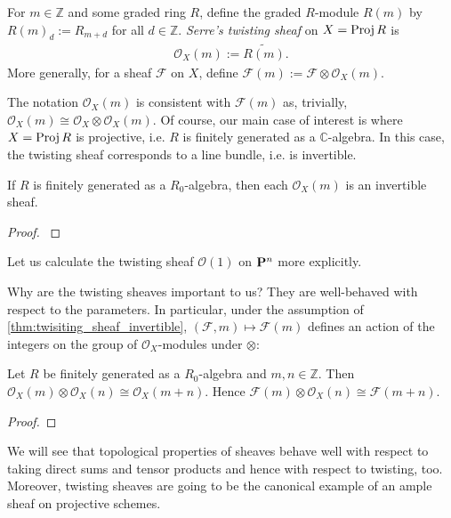 \documentclass[12pt]{ociamthesis}  %
\begin{document}
\begin{definition}
  For $m\in\mathbb{Z}$ and some graded ring $R$, define the graded
  $R$-module $R(m)$ by $R(m)_d := R_{m+d}$ for all $d\in\mathbb{Z}$. \emph{Serre's
    twisting sheaf} on $X=\operatorname{Proj} R$ is
  \begin{align*}
    \mathscr O_X(m) := \widetilde{R(m)}.
  \end{align*}
  More generally, for a sheaf $\mathscr F$ on $X$, define
  $\mathscr F(m) := \mathscr F \otimes \mathscr O_X(m)$.
\end{definition}
The notation $\mathscr O_X(m)$ is consistent with $\mathscr F(m)$
as, trivially, $\mathscr O_X(m) \cong \mathscr O_X \otimes \mathscr O_X(m)$.
Of course, our main case of interest is where $X=\operatorname{Proj} R$ is
projective, i.e. $R$ is finitely generated as a $\mathbb C$-algebra.
In this case, the twisting sheaf corresponds to a line bundle,
i.e. is invertible.

\begin{proposition}
  \label{thm:twisiting_sheaf_invertible}
  If $R$ is finitely generated as a $R_0$-algebra, then each
  $\mathscr O_X(m)$ is an invertible sheaf.
  \begin{proof}
    \cite[Proposition 13.15]{gortz2010}
    \missingproof
  \end{proof}
\end{proposition}

\begin{example}
  Let us calculate the twisting sheaf $\mathscr O(1)$ on $\mathbf{P}^{n}_{}$
  more explicitly.
  \missingexample
\end{example}

Why are the twisting sheaves important to us?  They are well-behaved
with respect to the parameters. In particular,
under the assumption of \ref{thm:twisiting_sheaf_invertible},
$(\mathscr F,m)\mapsto \mathscr F(m)$ defines an action of
the integers on the group of $\mathscr O_X$-modules under
$\otimes$:

\begin{lemma}\label{lem:additivity_twisting_sheaf}
  Let $R$ be finitely generated as a $R_0$-algebra and $m,n\in\mathbb{Z}$.
  Then $\mathscr O_X(m) \otimes \mathscr O_X(n) \cong \mathscr O_X(m + n)$. Hence
  $\mathscr F(m) \otimes \mathscr O_X(n) \cong \mathscr F(m+n)$.
  \begin{proof}
    \missingproof
  \end{proof}
\end{lemma}

We will see that topological properties of sheaves behave well
with respect to taking direct sums and tensor products and hence
with respect to twisting, too. Moreover, twisting sheaves are going
to be the canonical example of an ample sheaf on projective schemes.
\end{document}
